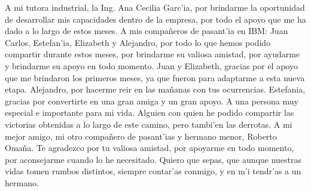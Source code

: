 \newline
\newline
\indent A mi tutora industrial, la Ing. Ana Cecilia Garc'ia, por brindarme la oportunidad de desarrollar mis capacidades dentro de la empresa, por todo el apoyo que me ha dado a lo largo de estos meses.
\newline
\indent A mis compa\~neros de pasant'ia en IBM: Juan Carlos, Estefan'ia, Elizabeth y Alejandro, por todo lo que hemos podido compartir durante estos meses, por brindarme su valiosa amistad, por ayudarme y brindarme su apoyo en todo momento. Juan y Elizabeth, gracias por el apoyo que me brindaron los primeros meses, ya que fueron para adaptarme a esta nueva etapa. Alejandro, por hacerme reir en las ma\~nanas con tus ocurrencias. Estefania, gracias por convertirte en una gran amiga y un gran apoyo.
\newline
\newline
\indent A una persona muy especial e importante para mi vida. Alguien con quien he podido compartir las victorias obtenidas a lo largo de este camino, pero tambi'en las derrotas. A mi mejor amigo, mi otro compa\~nero de pasant'ias y hermano menor, Roberto Oma\~na. Te agradezco por tu valiosa amistad, por apoyarme en todo momento, por aconsejarme cuando lo he necesitado. Quiero que sepas, que aunque nuestras vidas tomen rumbos distintos, siempre contar'as conmigo, y en m'i tendr'as a un hermano.






